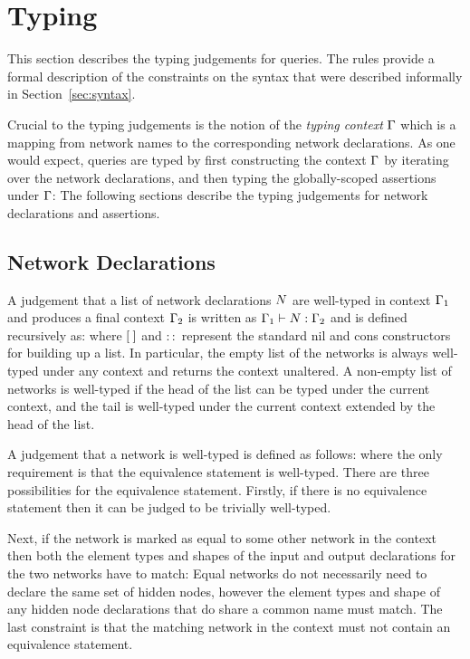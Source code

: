 \section{Typing}
\label{sec:typing}

This section describes the typing judgements for \vnnlib{} queries. The rules provide a formal description of the constraints on the syntax that were described informally in Section~\ref{sec:syntax}. 

Crucial to the typing judgements is the notion of the \emph{typing context} $\Gamma$ which is a mapping from network names to the corresponding network declarations.
As one would expect, queries are typed by first constructing the context $\Gamma$ by iterating over the network declarations, and then typing the globally-scoped assertions under $\Gamma$:
\unskip
The following sections describe the typing judgements for network declarations and assertions.

\subsection{Network Declarations}

A judgement that a list of network declarations $N$ are well-typed in context $\Gamma_1$ and produces a final context $\Gamma_2$ is written as $\Gamma_1 \vdash N : \Gamma_2$ and is defined recursively as:
\unskip
where $[\:]$ and $::$ represent the standard nil and cons constructors for building up a list.
In particular, the empty list of the networks is always well-typed under any context and returns the context unaltered. A non-empty list of networks is well-typed if the head of the list can be typed under the current context, and the tail is well-typed under the current context extended by the head of the list.

A judgement that a network is well-typed is defined as follows:
\unskip
where the only requirement is that the equivalence statement is well-typed. 
There are three possibilities for the equivalence statement. Firstly, if there is no equivalence statement then it can be judged to be trivially well-typed. 

Next, if the network is marked as equal to some other network in the context then both the element types and shapes of the input and output declarations for the two networks have to match:
\unskip
Equal networks do not necessarily need to declare the same set of hidden nodes, however the element types and shape of any hidden node declarations that do share a common name must match. The last constraint is that the matching network in the context must not contain an equivalence statement.


